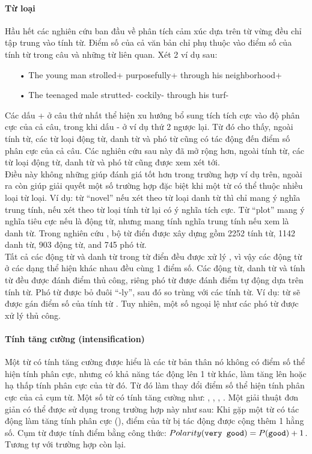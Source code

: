 \paragraph*{Từ loại}
Hầu hết các nghiên cứu ban đầu về phân tích cảm xúc dựa trên từ vừng đều chỉ tập trung vào tính từ. Điểm số của cả văn bản chỉ phụ thuộc vào điểm số của tính từ trong câu và những từ liên quan. 
Xét 2 ví dụ sau: 
\begin{itemize}
\item[•] The young man strolled+ purposefully+ through his neighborhood+
\item[•] The teenaged male strutted- cockily- through his turf-
\end{itemize}
Các dấu + ở câu thứ nhất thể hiện xu hướng bổ sung tích tích cực vào độ phân cực của cả câu, trong khi dấu - ở ví dụ thứ 2 ngược lại. Từ đó cho thấy, ngoài tính từ, các từ loại động từ, danh từ và phó từ cũng có tác động đến điểm số phân cực của cả câu. Các nghiên cứu sau này đã mở rộng hơn, ngoài tính từ, các từ loại động từ, danh từ và phó từ cũng được xem xét tới. \\

Điều này không những giúp đánh giá tốt hơn trong trường hợp ví dụ trên, ngoài ra còn giúp giải quyết một số trường hợp đặc biệt khi một từ có thể thuộc nhiều loại từ loại. Ví dụ: từ ``novel'' nếu xét theo từ loại danh từ thì chỉ mang ý nghĩa trung tính, nếu xét theo từ loại tính từ lại có ý nghĩa tích cực. Từ ``plot'' mang ý nghĩa tiêu cực nếu là động từ, nhưng mang tính nghĩa trung tính nếu xem là danh từ. Trong nghiên cứu \cite{taboada2011lexicon}, bộ từ điển được xây dựng gồm 2252 tính từ, 1142 danh từ, 903 động từ, and 745 phó từ. \\

Tất cả các động từ và danh từ trong từ điển đều được xử lý , vì vậy các động từ ở các dạng thể hiện khác nhau đều cùng 1 điểm số. Các động từ, danh từ và tính từ đều được đánh điểm thủ công, riêng phó từ được đánh điểm tự động dựa trên tính từ. Phó từ được bỏ đuôi ``-ly'', sau đó so trùng với các tính từ. Ví dụ: từ  sẽ được gán điểm số của tính từ . Tuy nhiên, một số ngoại lệ như các phó từ  được xử lý thủ công. 
\paragraph*{Tính tăng cường (intensification)}
Một từ có tính tăng cường được hiểu là các từ bản thân nó không có điểm số thể hiện tính phân cực, nhưng có khả năng tác động lên 1 từ khác, làm tăng lên hoặc hạ thấp tính phân cực của từ đó. Từ đó làm thay đổi điểm số thể hiện tính phân cực của cả cụm từ. Một số từ có tính tăng cường như: , , , . Một giải thuật đơn giản có thể được sử dụng trong trường hợp này như sau:
Khi gặp một từ có tác động làm tăng tính phân cực (), điểm của từ bị tác động được cộng thêm 1 hằng số. 
Cụm từ  được tính điểm bằng công thức: $Polarity(\text{{\ttfamily very good}}) = P(\text{{\ttfamily good}}) + 1$.
Tương tự với trường hợp còn lại. \\

